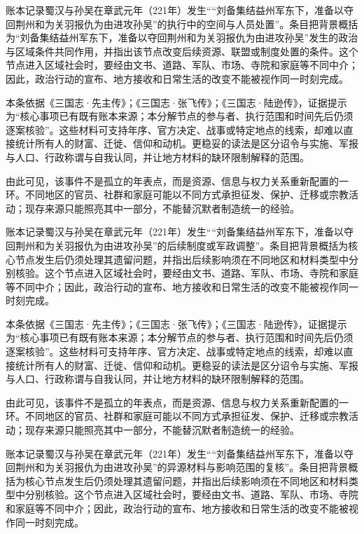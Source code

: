 账本记录蜀汉与孙吴在章武元年（221年）发生““刘备集结益州军东下，准备以夺回荆州和为关羽报仇为由进攻孙吴”的执行中的空间与人员处置”。条目把背景概括为“刘备集结益州军东下，准备以夺回荆州和为关羽报仇为由进攻孙吴”发生的政治与区域条件共同作用，并指出该节点改变后续资源、联盟或制度处置的条件。这个节点进入区域社会时，要经由文书、道路、军队、市场、寺院和家庭等不同中介；因此，政治行动的宣布、地方接收和日常生活的改变不能被视作同一时刻完成。

本条依据《三国志·先主传》；《三国志·张飞传》；《三国志·陆逊传》，证据提示为“核心事项已有既有账本来源；本分解节点的参与者、执行范围和时间先后仍须逐案核验”。这些材料可支持年序、官方决定、战事或特定地点的线索，却难以直接统计所有人的财富、迁徙、信仰和动机。更稳妥的读法是区分诏令与实施、军报与人口、行政称谓与自我认同，并让地方材料的缺环限制解释的范围。

由此可见，该事件不是孤立的年表点，而是资源、信息与权力关系重新配置的一环。不同地区的官员、社群和家庭可能以不同方式承担征发、保护、迁移或宗教活动；现存来源只能照亮其中一部分，不能替沉默者制造统一的经验。

账本记录蜀汉与孙吴在章武元年（221年）发生““刘备集结益州军东下，准备以夺回荆州和为关羽报仇为由进攻孙吴”的后续制度或军政调整”。条目把背景概括为核心节点发生后仍须处理其遗留问题，并指出后续影响须在不同地区和材料类型中分别核验。这个节点进入区域社会时，要经由文书、道路、军队、市场、寺院和家庭等不同中介；因此，政治行动的宣布、地方接收和日常生活的改变不能被视作同一时刻完成。

本条依据《三国志·先主传》；《三国志·张飞传》；《三国志·陆逊传》，证据提示为“核心事项已有既有账本来源；本分解节点的参与者、执行范围和时间先后仍须逐案核验”。这些材料可支持年序、官方决定、战事或特定地点的线索，却难以直接统计所有人的财富、迁徙、信仰和动机。更稳妥的读法是区分诏令与实施、军报与人口、行政称谓与自我认同，并让地方材料的缺环限制解释的范围。

由此可见，该事件不是孤立的年表点，而是资源、信息与权力关系重新配置的一环。不同地区的官员、社群和家庭可能以不同方式承担征发、保护、迁移或宗教活动；现存来源只能照亮其中一部分，不能替沉默者制造统一的经验。

账本记录蜀汉与孙吴在章武元年（221年）发生““刘备集结益州军东下，准备以夺回荆州和为关羽报仇为由进攻孙吴”的异源材料与影响范围的复核”。条目把背景概括为核心节点发生后仍须处理其遗留问题，并指出后续影响须在不同地区和材料类型中分别核验。这个节点进入区域社会时，要经由文书、道路、军队、市场、寺院和家庭等不同中介；因此，政治行动的宣布、地方接收和日常生活的改变不能被视作同一时刻完成。

